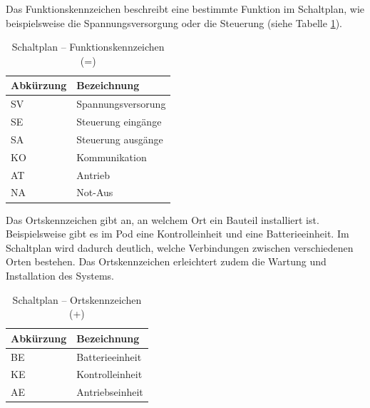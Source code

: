 Das Funktionskennzeichen beschreibt eine bestimmte Funktion im Schaltplan, wie beispielsweise die Spannungsversorgung oder die Steuerung (siehe Tabelle \ref{bmk:funktionskennzeichen}).

\begin{table}[!ht]
	\centering
	\caption{Schaltplan – Funktionskennzeichen (=)}
	\label{bmk:funktionskennzeichen}
	\begin{tabular}{ll}
		\hline
		\textbf{Abkürzung}      & \textbf{Bezeichnung} \\ \hline
		\multicolumn{1}{l|}{SV} & Spannungsversorung   \\
		\multicolumn{1}{l|}{SE} & Steuerung eingänge   \\
		\multicolumn{1}{l|}{SA} & Steuerung ausgänge   \\
		\multicolumn{1}{l|}{KO} & Kommunikation        \\
		\multicolumn{1}{l|}{AT} & Antrieb              \\
		\multicolumn{1}{l|}{NA} & Not-Aus              \\ \hline
	\end{tabular}
\end{table}

Das Ortskennzeichen gibt an, an welchem Ort ein Bauteil installiert ist. Beispielsweise gibt es im Pod eine Kontrolleinheit und eine Batterieeinheit. Im Schaltplan wird dadurch deutlich, welche Verbindungen zwischen verschiedenen Orten bestehen. Das Ortskennzeichen erleichtert zudem die Wartung und Installation des Systems.

\begin{table}[!ht]
	\centering
	\caption{Schaltplan – Ortskennzeichen (+)}
	\label{bmk:ortskennzeichen}
	\begin{tabular}{ll}
		\hline
		\textbf{Abkürzung}      & \textbf{Bezeichnung} \\ \hline
		\multicolumn{1}{l|}{BE} & Batterieeinheit      \\
		\multicolumn{1}{l|}{KE} & Kontrolleinheit      \\
		\multicolumn{1}{l|}{AE} & Antriebseinheit      \\ \hline
	\end{tabular}
\end{table}


